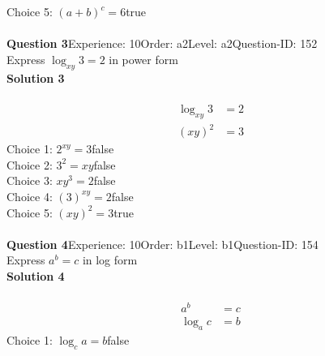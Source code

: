 \documentclass{article}
\begin{document}
Choice 5: \hspace{20pt}$(a+b)^c=6$\hspace{20pt}true\\
\\[4pt]
\noindent\textbf{Question 3}\hspace{20pt}Experience: 10\hspace{20pt}Order: a2\hspace{20pt}Level: a2\hspace{20pt}Question-ID: 152\\[2pt]
Express $\log_{xy}3=2$ in power form\\[4pt]
\noindent\textbf{Solution 3}\\[2pt]
\\[-35pt]\begin{align*}
\log_{xy}3&=2\\[2pt]
(xy)^2&=3
\end{align*}
Choice 1: \hspace{20pt}$2^{xy}=3$\hspace{20pt}false\\
Choice 2: \hspace{20pt}$3^2=xy$\hspace{20pt}false\\
Choice 3: \hspace{20pt}$xy^{3}=2$\hspace{20pt}false\\
Choice 4: \hspace{20pt}$(3)^{xy}=2$\hspace{20pt}false\\
Choice 5: \hspace{20pt}$(xy)^2=3$\hspace{20pt}true\\
\\[4pt]
\noindent\textbf{Question 4}\hspace{20pt}Experience: 10\hspace{20pt}Order: b1\hspace{20pt}Level: b1\hspace{20pt}Question-ID: 154\\[2pt]
Express $a^b=c$ in log form\\[4pt]
\noindent\textbf{Solution 4}\\[2pt]
\\[-35pt]\begin{align*}
a^b&=c\\[2pt]
\log_ac&=b
\end{align*}
Choice 1: \hspace{20pt}$\log_ca=b$\hspace{20pt}false\\
\end{document}
